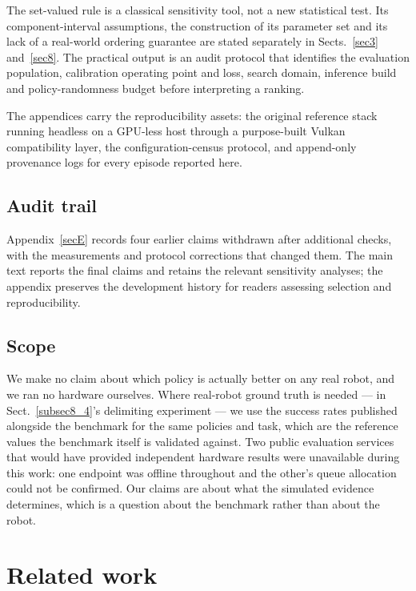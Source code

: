 \documentclass[pdflatex,iicol,sn-apa]{sn-jnl}
\theoremstyle{remark}
\begin{document}
\noindent The set-valued rule is a classical sensitivity tool, not a new statistical test. Its
component-interval assumptions, the construction of its parameter set and its lack of a real-world
ordering guarantee are stated separately in Sects.~\ref{sec3} and~\ref{sec8}. The practical output is
an audit protocol that identifies the evaluation population, calibration operating point and loss,
search domain, inference build and policy-randomness budget before interpreting a ranking.

\noindent The appendices carry the reproducibility assets: the original reference stack running
headless on a GPU-less host through a purpose-built Vulkan compatibility layer, the
configuration-census protocol, and append-only provenance logs for every episode reported here.

\subsection{Audit trail}\label{subsec1_2}

Appendix~\ref{secE} records four earlier claims withdrawn after additional checks, with the
measurements and protocol corrections that changed them. The main text reports the final claims
and retains the relevant sensitivity analyses; the appendix preserves the development history for
readers assessing selection and reproducibility.

\subsection{Scope}\label{subsec1_3}

We make no claim about which policy is actually better on any real robot, and we ran no hardware
ourselves. Where real-robot ground truth is needed --- in Sect.~\ref{subsec8_4}'s delimiting
experiment --- we use the success rates published alongside the benchmark for the same policies and
task, which are the reference values the benchmark itself is validated against. Two public
evaluation services that would have provided independent hardware results were unavailable during
this work: one endpoint was offline throughout and the other's queue allocation could not be
confirmed. Our claims are about what the simulated evidence determines, which is a question about
the benchmark rather than about the robot.

\section{Related work}\label{sec2}
\end{document}

